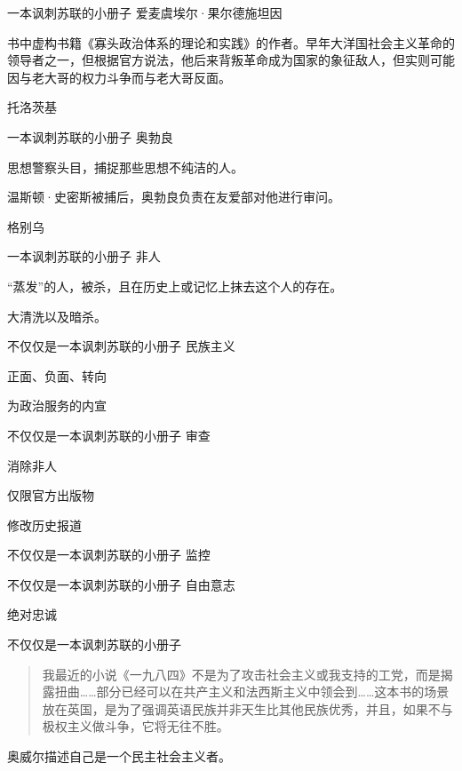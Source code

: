 \documentclass{beamer}
\begin{document}
  \begin{frame}{一本讽刺苏联的小册子}
    爱麦虞埃尔·果尔德施坦因

    书中虚构书籍《寡头政治体系的理论和实践》的作者。早年大洋国社会主义革命的领导者之一，但根据官方说法，他后来背叛革命成为国家的象征敌人，但实则可能因与老大哥的权力斗争而与老大哥反面。

    托洛茨基
  \end{frame}
  \begin{frame}{一本讽刺苏联的小册子}
    奥勃良

    思想警察头目，捕捉那些思想不纯洁的人。

    温斯顿·史密斯被捕后，奥勃良负责在友爱部对他进行审问。

    格别乌
  \end{frame}
  \begin{frame}{一本讽刺苏联的小册子}
    非人

    “蒸发”的人，被杀，且在历史上或记忆上抹去这个人的存在。

    大清洗以及暗杀。
  \end{frame}
  \begin{frame}{不仅仅是一本讽刺苏联的小册子}
    民族主义

    正面、负面、转向

    为政治服务的内宣
  \end{frame}
  \begin{frame}{不仅仅是一本讽刺苏联的小册子}
    审查
    
    消除非人

    仅限官方出版物

    修改历史报道
  \end{frame}
  \begin{frame}{不仅仅是一本讽刺苏联的小册子}
    监控
  \end{frame}
  \begin{frame}{不仅仅是一本讽刺苏联的小册子}
    自由意志

    绝对忠诚
  \end{frame}
  \begin{frame}{不仅仅是一本讽刺苏联的小册子}
    \begin{quotation}
      \noindent
      我最近的小说《一九八四》不是为了攻击社会主义或我支持的工党，而是揭露扭曲……部分已经可以在共产主义和法西斯主义中领会到……这本书的场景放在英国，是为了强调英语民族并非天生比其他民族优秀，并且，如果不与极权主义做斗争，它将无往不胜。
    \end{quotation}
    奥威尔描述自己是一个民主社会主义者。
  \end{frame}
\end{document}
